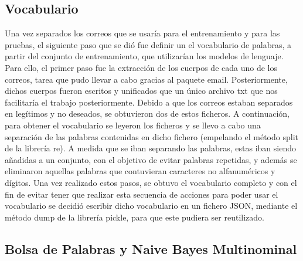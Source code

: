 \documentclass[conference,a4paper]{IEEEtran}
\begin{document}
\subsection{Vocabulario}
Una vez separados los correos que se usaría para el entrenamiento y para las pruebas, el siguiente paso que se dió fue definir un el vocabulario de palabras, a partir del conjunto de entrenamiento, que  utilizarían los modelos de lenguaje. Para ello, el primer paso fue la extracción de los cuerpos de cada uno de los correos, tarea que pudo llevar a cabo gracias al paquete email. Posteriormente, dichos cuerpos fueron escritos y unificados que un único archivo txt que nos facilitaría el trabajo posteriormente. Debido a que los correos estaban separados en legítimos y no deseados, se obtuvieron dos de estos ficheros. A continuación, para obtener el vocabulario se leyeron los ficheros y se llevo a cabo una separación de las palabras contenidas en dicho fichero (empelando el método split de la librería re). A medida que se iban separando las palabras, estas iban siendo añadidas a un conjunto, con el objetivo de evitar palabras repetidas, y además se eliminaron aquellas palabras que contuvieran caracteres no alfanuméricos y dígitos. Una vez realizado estos pasos, se obtuvo el vocabulario completo y con el fin de evitar tener que realizar esta secuencia de acciones para poder usar el vocabulario se decidió escribir dicho vocabulario en un fichero JSON, mediante el método dump de la librería pickle, para que este pudiera ser reutilizado.



\subsection{Bolsa de Palabras y Naive Bayes Multinominal}
\end{document}
